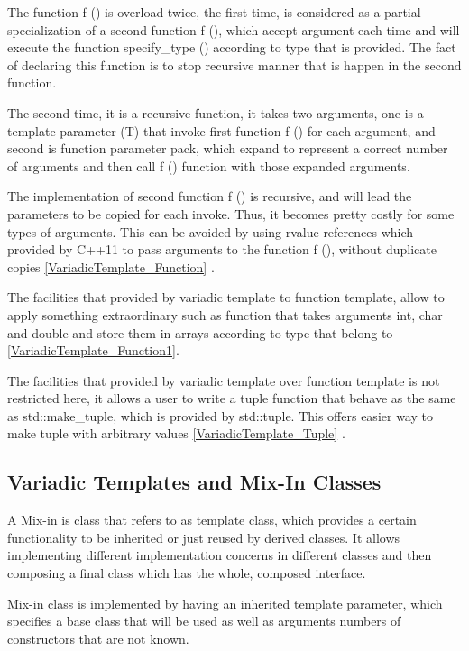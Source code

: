 \documentclass[11pt]{report}
\begin{document}
The function f () is overload twice, the first time, is considered as a partial specialization of a second function f (), which accept argument each time and will execute the function specify\_type () according to type that is provided.  The fact of declaring this function is to stop recursive manner that is happen in the second function.


The second time, it is a recursive function, it takes two arguments, one is a template parameter (T) that invoke first function f () for each argument, and second is function parameter pack, which expand to represent a correct number of arguments and then call f () function with those expanded arguments.


The implementation of second function f () is recursive, and will lead the parameters to be copied for each invoke. Thus, it becomes pretty costly for some types of arguments. This can be avoided by using rvalue references which provided by C++11 to pass arguments to the function f (), without duplicate copies \ref{VariadicTemplate_Function} \cite{Gregorie:professionalcpp}.


The facilities that provided by variadic template to function template, allow to apply something extraordinary such as function that takes arguments int, char and double and store them in arrays according to type that belong to \ref{VariadicTemplate_Function1}.


The facilities that provided by variadic template over function template is not restricted here, it allows a user to write a tuple function that behave as the same as std::make\_tuple, which is provided by std::tuple. This offers easier way to make tuple with arbitrary values \ref{VariadicTemplate_Tuple} \cite{Gregorie:professionalcpp}.


\subsection{Variadic Templates and Mix-In Classes}
\label{subsection: Variadic Templates and Mix-In Classes}
A Mix-in is class that refers to as template class, which provides a certain functionality to be inherited or just reused by derived classes. It allows implementing different implementation concerns in different classes and then composing a final class which has the whole, composed interface.


Mix-in class is implemented by having an inherited template parameter, which specifies a base class that will be used as well as arguments numbers of constructors that are not known.\\
\end{document}
